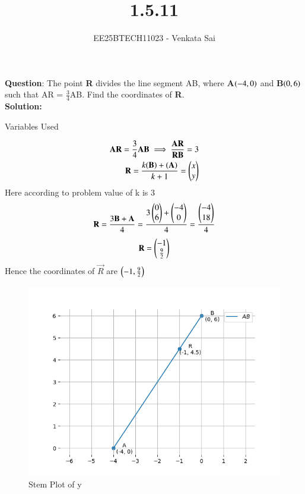 \documentclass[journal]{IEEEtran}
\begin{document}


\title{1.5.11}
\author{EE25BTECH11023 - Venkata Sai}
{\let\newpage\relax\maketitle}

\renewcommand{\thefigure}{\theenumi}
\renewcommand{\thetable}{\theenumi}
\setlength{\intextsep}{10pt} %


\renewcommand{\thetable}{\theenumi}


\textbf{Question}:\newline
The point \textbf{R} divides the line segment AB, where \textbf{A}$\left(-4,0\right)$ and \textbf{B}$\left(0,6\right)$ such that
AR = $\frac{3}{4}$AB. Find the coordinates of \textbf{R}. 
\\
\textbf{Solution: }
\begin{table}[h!]    
  \centering
  
  \caption{Variables Used}
\end{table}
\begin{align}
\mathbf{AR}=\frac{3}{4}\mathbf{AB} \implies \frac{\mathbf{AR}}{\mathbf{RB}}=3\\
\mathbf{R}=\frac{k(\mathbf{B})+(\mathbf{A})}{k+1}=\begin{pmatrix}x\\y\end{pmatrix}\\
\end{align}
Here according to problem value of k is 3\\
\begin{align}
\mathbf{R}=\frac{3\mathbf{B}+\mathbf{A}}{4}=\frac{3\begin{pmatrix}0\\6\end{pmatrix}+\begin{pmatrix}-4\\0\end{pmatrix}}{4}=\frac{\begin{pmatrix}-4\\18\end{pmatrix}}{4}\\
\end{align}
\begin{align}
\mathbf{R}=\begin{pmatrix}-1\\\frac{9}{2}\end{pmatrix}
\end{align}
Hence the coordinates of $\vec{R}$ are $\left(-1,\frac{9}{2}\right)$
\begin{figure}[h!]
   \centering
   \includegraphics[width=0.7\columnwidth]{figs/Fig1.png}
   \caption{Stem Plot of y}
   \label{stemplot}
\end{figure}
\end{document}
